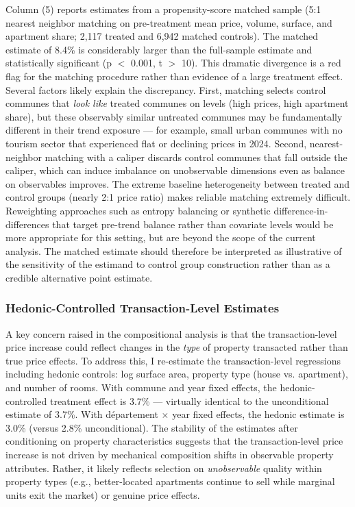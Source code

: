 \documentclass[12pt]{article}
\begin{document}
Column (5) reports estimates from a propensity-score matched sample (5:1 nearest neighbor matching on pre-treatment mean price, volume, surface, and apartment share; 2,117 treated and 6,942 matched controls). The matched estimate of 8.4\% is considerably larger than the full-sample estimate and statistically significant (p $<$ 0.001, t $>$ 10). This dramatic divergence is a red flag for the matching procedure rather than evidence of a large treatment effect. Several factors likely explain the discrepancy. First, matching selects control communes that \textit{look like} treated communes on levels (high prices, high apartment share), but these observably similar untreated communes may be fundamentally different in their trend exposure --- for example, small urban communes with no tourism sector that experienced flat or declining prices in 2024. Second, nearest-neighbor matching with a caliper discards control communes that fall outside the caliper, which can induce imbalance on unobservable dimensions even as balance on observables improves. The extreme baseline heterogeneity between treated and control groups (nearly 2:1 price ratio) makes reliable matching extremely difficult. Reweighting approaches such as entropy balancing or synthetic difference-in-differences that target pre-trend balance rather than covariate levels would be more appropriate for this setting, but are beyond the scope of the current analysis. The matched estimate should therefore be interpreted as illustrative of the sensitivity of the estimand to control group construction rather than as a credible alternative point estimate.

\subsubsection{Hedonic-Controlled Transaction-Level Estimates}

A key concern raised in the compositional analysis is that the transaction-level price increase could reflect changes in the \textit{type} of property transacted rather than true price effects. To address this, I re-estimate the transaction-level regressions including hedonic controls: log surface area, property type (house vs. apartment), and number of rooms. With commune and year fixed effects, the hedonic-controlled treatment effect is 3.7\% --- virtually identical to the unconditional estimate of 3.7\%. With d\'epartement $\times$ year fixed effects, the hedonic estimate is 3.0\% (versus 2.8\% unconditional). The stability of the estimates after conditioning on property characteristics suggests that the transaction-level price increase is not driven by mechanical composition shifts in observable property attributes. Rather, it likely reflects selection on \textit{unobservable} quality within property types (e.g., better-located apartments continue to sell while marginal units exit the market) or genuine price effects.
\end{document}
